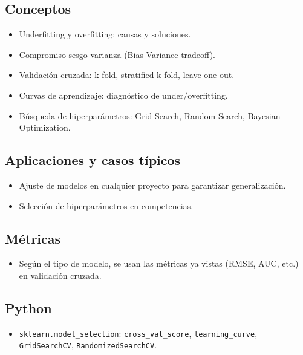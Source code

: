 \documentclass[12pt,a4paper,openany,oneside]{book}
\begin{document}
\subsection{Conceptos}
\begin{itemize}
    \item Underfitting y overfitting: causas y soluciones.
    \item Compromiso sesgo-varianza (Bias-Variance tradeoff).
    \item Validación cruzada: k-fold, stratified k-fold, leave-one-out.
    \item Curvas de aprendizaje: diagnóstico de under/overfitting.
    \item Búsqueda de hiperparámetros: Grid Search, Random Search, Bayesian Optimization.
\end{itemize}

\subsection{Aplicaciones y casos típicos}
\begin{itemize}
    \item Ajuste de modelos en cualquier proyecto para garantizar generalización.
    \item Selección de hiperparámetros en competencias.
\end{itemize}

\subsection{Métricas}
\begin{itemize}
    \item Según el tipo de modelo, se usan las métricas ya vistas (RMSE, AUC, etc.) en validación cruzada.
\end{itemize}

\subsection{Python}
\begin{itemize}
    \item \texttt{sklearn.model\_selection}: \texttt{cross\_val\_score}, \texttt{learning\_curve}, \texttt{GridSearchCV}, \texttt{RandomizedSearchCV}.
\end{itemize}

\end{document}
